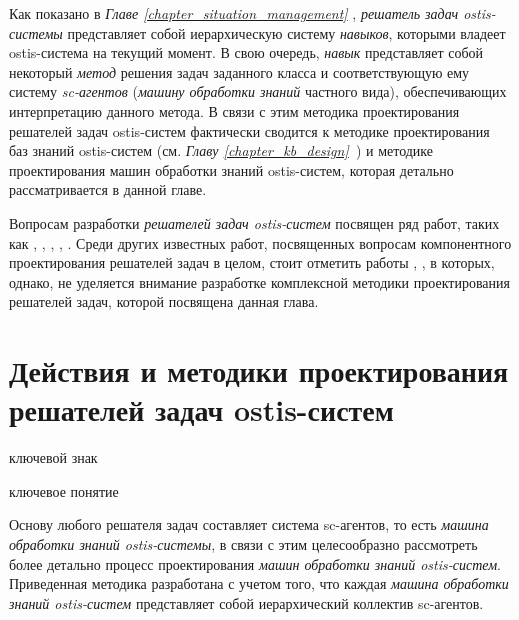 Как показано в \textit{Главе \ref{chapter_situation_management} }, \textit{решатель задач ostis-системы} представляет собой иерархическую систему \textit{навыков}, которыми владеет ostis-система на текущий момент. В свою очередь, \textit{навык} представляет собой некоторый \textit{метод} решения задач заданного класса и соответствующую ему систему \textit{sc-агентов} (\textit{машину обработки знаний} частного вида), обеспечивающих интерпретацию данного метода. В связи с этим методика проектирования решателей задач ostis-систем фактически сводится к методике проектирования баз знаний ostis-систем (см. \textit{Главу \ref{chapter_kb_design}~}) и методике проектирования машин обработки знаний ostis-систем, которая детально рассматривается в данной главе.

Вопросам разработки \textit{решателей задач ostis-систем} посвящен ряд работ, таких как 
, , , , . Среди других известных работ, посвященных вопросам компонентного проектирования решателей задач в целом, стоит отметить работы , , в которых, однако, не уделяется внимание разработке комплексной методики проектирования решателей задач, которой посвящена данная глава.

\section{Действия и методики проектирования решателей задач ostis-систем}
\label{sec_ps_design_methodology}
\begin{SCn}
\bigskip

\begin{scnrelfromlist}{ключевой знак}
\end{scnrelfromlist}

\bigskip

\begin{scnrelfromlist}{ключевое понятие}
\end{scnrelfromlist}

\end{SCn}

Основу любого решателя задач составляет система sc-агентов, то есть \textit{машина обработки знаний ostis-системы}, в связи с этим целесообразно рассмотреть более детально процесс проектирования \textit{машин обработки знаний ostis-систем}. Приведенная методика разработана с учетом того, что каждая \textit{машина обработки знаний ostis-систем} представляет собой иерархический коллектив sc-агентов.

